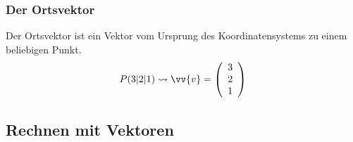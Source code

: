 \documentclass[a4paper, 15pt]{article}
\begin{document}
\subsubsection{Der Ortsvektor}
\begin{minipage}{.49\textwidth}
Der Ortsvektor ist ein Vektor vom Ursprung des Koordinatensystems zu einem beliebigen Punkt.
\begin{equation*}
P(3|2|1)\leadsto\vv{v}= \left(\begin{array}{c} 3 \\ 2 \\ 1 \end{array}\right)
\end{equation*}
\end{minipage}
\begin{minipage}{.49\textwidth}
\flushright
\begin{center}
\end{center}
\end{minipage}
\subsection{Rechnen mit Vektoren}
\end{document}
